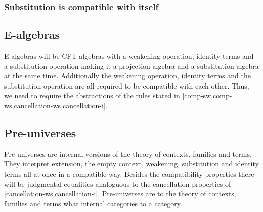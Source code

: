 \subsubsection{Substitution is compatible with itself}

\subsection{E-algebras}
E-algebras will be CFT-algebras with a weakening operation, identity terms and
a substitution operation making it a projection algebra and a substitution 
algebra at the same time. Additionally the weakening operation, identity terms
and the substitution operation are all required to be compatible with each
other. Thus, we need to require the abstractions of the rules stated in
\autoref{comp-sw,comp-ws,cancellation-ws,cancellation-i}.

\subsection{Pre-universes}
Pre-universes are internal versions of the theory of contexts, families and
terms. They interpret extension, the empty context, weakening, substitution
and identity terms all at once in a compatible way. Besides the compatibility
properties there will be judgmental equalities analoguous to the cancellation
properties of \autoref{cancellation-ws,cancellation-i}. Pre-universes are to
the theory of contexts, families and terms what internal categories to a
category.
